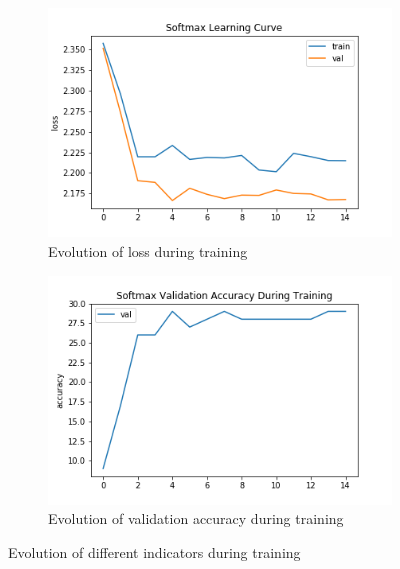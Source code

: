 

\begin{figure}[h!]
  \begin{center}
    \begin{subfigure}[t]{0.49\linewidth}
      \centering
      \includegraphics[width=\linewidth]{../code/assignment/2_pytorch/softmax_lossvstrain.png}
      \caption{Evolution of loss during training}
    \end{subfigure}
    \begin{subfigure}[t]{0.49\linewidth}
      \centering
      \includegraphics[width=\linewidth]{../code/assignment/2_pytorch/softmax_valaccuracy.png}
      \caption{Evolution of validation accuracy during training}
    \end{subfigure}
    \caption{Evolution of different indicators during training}
  \end{center}
\end{figure}

